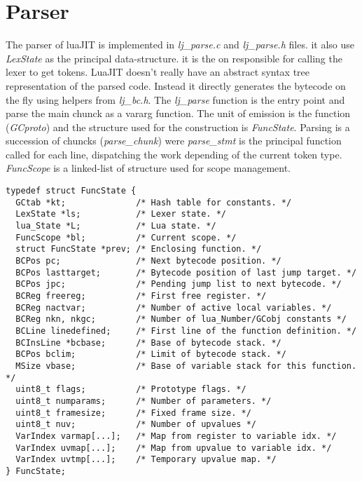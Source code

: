 
\section{Parser}
\label{Sec:Parser}

The parser of luaJIT is implemented in \emph{lj\_parse.c} and \emph{lj\_parse.h}
files. it also use \emph{LexState} as the principal data-structure. it is the on
responsible for calling the lexer to get tokens. LuaJIT doesn't really have an
abstract syntax tree representation of the parsed code. Instead it directly
generates the bytecode on the fly using helpers from \emph{lj\_bc.h}.
The \emph{lj\_parse} function is the entry point and parse the main chunck as a
vararg function. The unit of emission is the function (\emph{GCproto}) and the structure used for the construction is \emph{FuncState}. Parsing is a succession
of chuncks (\emph{parse\_chunk}) were \emph{parse\_stmt} is the principal
function called for each line, dispatching the work depending of the current
token type. \emph{FuncScope} is a linked-list of structure used for scope
management.

\begin{lstlisting}[style=CStyle]
typedef struct FuncState {
  GCtab *kt;              /* Hash table for constants. */
  LexState *ls;           /* Lexer state. */
  lua_State *L;           /* Lua state. */
  FuncScope *bl;          /* Current scope. */
  struct FuncState *prev; /* Enclosing function. */
  BCPos pc;               /* Next bytecode position. */
  BCPos lasttarget;       /* Bytecode position of last jump target. */
  BCPos jpc;              /* Pending jump list to next bytecode. */
  BCReg freereg;          /* First free register. */
  BCReg nactvar;          /* Number of active local variables. */
  BCReg nkn, nkgc;        /* Number of lua_Number/GCobj constants */
  BCLine linedefined;     /* First line of the function definition. */
  BCInsLine *bcbase;      /* Base of bytecode stack. */
  BCPos bclim;            /* Limit of bytecode stack. */
  MSize vbase;            /* Base of variable stack for this function. */
  uint8_t flags;          /* Prototype flags. */
  uint8_t numparams;      /* Number of parameters. */
  uint8_t framesize;      /* Fixed frame size. */
  uint8_t nuv;            /* Number of upvalues */
  VarIndex varmap[...];   /* Map from register to variable idx. */
  VarIndex uvmap[...];    /* Map from upvalue to variable idx. */
  VarIndex uvtmp[...];    /* Temporary upvalue map. */
} FuncState;
\end{lstlisting}

